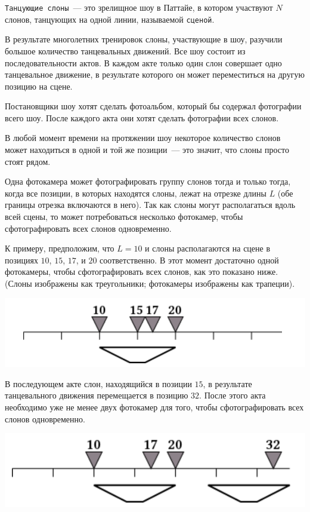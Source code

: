 \texttt{Танцующие слоны}~--- это зрелищное шоу в Паттайе, в котором участвуют $N$ слонов, танцующих на одной линии, называемой \texttt{сценой}.

В результате многолетних тренировок слоны, участвующие в шоу, разучили большое количество танцевальных движений. Все шоу состоит из последовательности актов. В каждом акте только один слон совершает одно танцевальное движение, в результате которого он может переместиться на другую позицию на сцене.

Постановщики шоу хотят сделать фотоальбом, который бы содержал фотографии всего шоу. После каждого акта они хотят сделать фотографии всех слонов.

В любой момент времени на протяжении шоу некоторое количество слонов может находиться в одной и той же позиции~--- это значит, что слоны просто стоят рядом.

Одна фотокамера может фотографировать группу слонов тогда и только тогда, когда все позиции, в которых находятся слоны, лежат на отрезке длины $L$ (обе границы отрезка включаются в него). Так как слоны могут располагаться вдоль всей сцены, то может потребоваться несколько фотокамер, чтобы сфотографировать всех слонов одновременно.

К примеру, предположим, что $L=10$ и слоны располагаются на сцене в позициях $10$, $15$, $17$, и $20$ соответственно. В этот момент достаточно одной фотокамеры, чтобы сфотографировать всех слонов, как это показано ниже. (Слоны изображены как треугольники; фотокамеры изображены как трапеции).

\includegraphics{elephants3.png}

В последующем акте слон, находящийся в позиции $15$, в результате танцевального движения перемещается в позицию $32$. После этого акта необходимо уже не менее двух фотокамер для того, чтобы сфотографировать всех слонов одновременно.

\includegraphics{elephants2.png}

